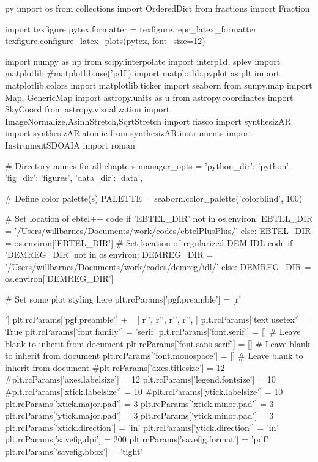 \begin{pythontexcustomcode}{py}
import os
from collections import OrderedDict
from fractions import Fraction

import texfigure
pytex.formatter = texfigure.repr_latex_formatter
texfigure.configure_latex_plots(pytex, font_size=12)

import numpy as np
from scipy.interpolate import interp1d, splev
import matplotlib
#matplotlib.use('pdf')
import matplotlib.pyplot as plt
import matplotlib.colors
import matplotlib.ticker
import seaborn
from sunpy.map import Map, GenericMap
import astropy.units as u
from astropy.coordinates import SkyCoord
from astropy.visualization import ImageNormalize,AsinhStretch,SqrtStretch
import fiasco
import synthesizAR
import synthesizAR.atomic
from synthesizAR.instruments import InstrumentSDOAIA
import roman

# Directory names for all chapters
manager_opts = {'python_dir': 'python', 'fig_dir': 'figures', 'data_dir': 'data',}

# Define color palette(s)
PALETTE = seaborn.color_palette('colorblind', 100)

# Set location of ebtel++ code
if 'EBTEL_DIR' not in os.environ:
	EBTEL_DIR = '/Users/willbarnes/Documents/work/codes/ebtelPlusPlus/'
else:
	EBTEL_DIR = os.environ['EBTEL_DIR']
# Set location of regularized DEM IDL code
if 'DEMREG_DIR' not in os.environ:
	DEMREG_DIR = '/Users/willbarnes/Documents/work/codes/demreg/idl/'
else:
	DEMREG_DIR = os.environ['DEMREG_DIR']

# Set some plot styling here
plt.rcParams['pgf.preamble'] = [r'\usepackage{siunitx}']
plt.rcParams['pgf.preamble'] += [
	r'\DeclareSIUnit[number-unit-product={}]',
	r'\DeclareSIUnit[number-unit-product={}]',
	r'\DeclareSIUnit[number-unit-product={}]',
	r'\DeclareSIUnit[number-unit-product={}]',
]
plt.rcParams['text.usetex'] = True
plt.rcParams['font.family'] = 'serif'
plt.rcParams['font.serif'] = [] # Leave blank to inherit from document
plt.rcParams['font.sans-serif'] = [] # Leave blank to inherit from document
plt.rcParams['font.monospace'] = [] # Leave blank to inherit from document
#plt.rcParams['axes.titlesize'] = 12
#plt.rcParams['axes.labelsize'] = 12
plt.rcParams['legend.fontsize'] = 10
#plt.rcParams['xtick.labelsize'] = 10
#plt.rcParams['ytick.labelsize'] = 10
plt.rcParams['xtick.major.pad'] = 3
plt.rcParams['xtick.minor.pad'] = 3
plt.rcParams['ytick.major.pad'] = 3
plt.rcParams['ytick.minor.pad'] = 3
plt.rcParams['xtick.direction'] = 'in'
plt.rcParams['ytick.direction'] = 'in'
plt.rcParams['savefig.dpi'] = 200
plt.rcParams['savefig.format'] = 'pdf'
plt.rcParams['savefig.bbox'] = 'tight'

\end{pythontexcustomcode}
